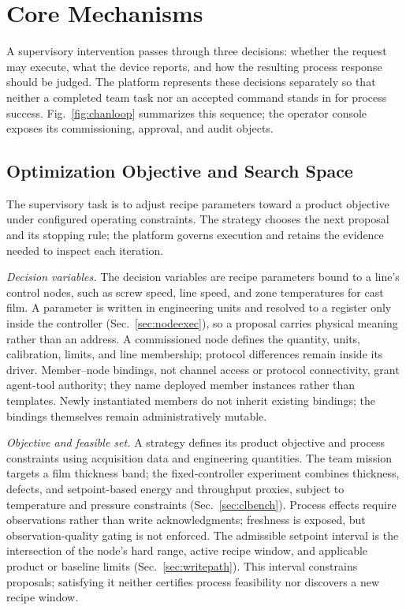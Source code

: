 \section{Core Mechanisms}
\label{sec:mech}
A supervisory intervention passes through three decisions: whether the
request may execute, what the device reports, and how the resulting process
response should be judged. The platform represents these decisions separately
so that neither a completed team task nor an accepted command stands in for
process success. Fig.~\ref{fig:chanloop} summarizes this sequence; the operator console
exposes its commissioning, approval, and audit objects.

\subsection{Optimization Objective and Search Space}
\label{sec:objective}
The supervisory task is to adjust recipe parameters toward a product
objective under configured operating constraints. The strategy chooses the
next proposal and its stopping rule; the platform governs execution and
retains the evidence needed to inspect each iteration.

\emph{Decision variables.} The decision variables are recipe parameters bound to a line's control
nodes, such as screw speed, line speed, and zone temperatures for cast film.
A parameter is written in engineering units and resolved to a register only
inside the controller (Sec.~\ref{sec:nodeexec}), so a proposal carries
physical meaning rather than an address. A commissioned node defines the
quantity, units, calibration, limits, and line membership; protocol
differences remain inside its driver. Member--node bindings, not channel
access or protocol connectivity, grant agent-tool authority; they name
deployed member instances rather than templates. Newly instantiated members
do not inherit existing bindings; the bindings themselves remain
administratively mutable.

\emph{Objective and feasible set.} A strategy defines its product objective and process constraints using
acquisition data and engineering quantities. The team mission targets a film
thickness band; the fixed-controller experiment combines thickness, defects,
and setpoint-based energy and throughput proxies, subject to temperature and
pressure constraints (Sec.~\ref{sec:clbench}). Process effects require
observations rather than write acknowledgments; freshness is exposed, but
observation-quality gating is not enforced. The admissible setpoint interval
is the intersection of the node's hard range, active recipe window, and
applicable product or baseline limits (Sec.~\ref{sec:writepath}). This
interval constrains proposals; satisfying it neither certifies process
feasibility nor discovers a new recipe window.

